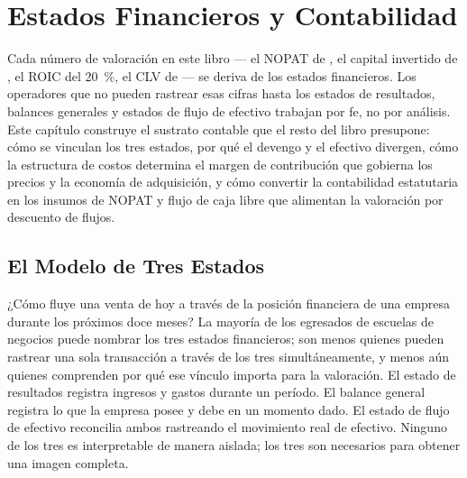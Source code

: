 \chapter{Estados Financieros y Contabilidad}\label{ch:financial-statements}


Cada número de valoración en este libro --- el NOPAT de , el capital invertido de
, el ROIC del \qty{20}{\percent}, el CLV de  --- se deriva de los
estados financieros. Los operadores que no pueden rastrear esas cifras hasta los estados de
resultados, balances generales y estados de flujo de efectivo trabajan por fe, no por análisis.
Este capítulo construye el sustrato contable que el resto del libro presupone: cómo se vinculan
los tres estados, por qué el devengo y el efectivo divergen, cómo la estructura de costos determina
el margen de contribución que gobierna los precios y la economía de adquisición, y cómo convertir
la contabilidad estatutaria en los insumos de NOPAT y flujo de caja libre que alimentan la
valoración por descuento de flujos.

\section{El Modelo de Tres Estados}\label{sec:three-statements}

¿Cómo fluye una venta de hoy a través de la posición financiera de una empresa durante los
próximos doce meses? La mayoría de los egresados de escuelas de negocios puede nombrar los tres
estados financieros; son menos quienes pueden rastrear una sola transacción a través de los tres
simultáneamente, y menos aún quienes comprenden por qué ese vínculo importa para la valoración.
El estado de resultados registra ingresos y gastos durante un período. El balance general registra
lo que la empresa posee y debe en un momento dado. El estado de flujo de efectivo reconcilia ambos
rastreando el movimiento real de efectivo. Ninguno de los tres es interpretable de manera aislada;
los tres son necesarios para obtener una imagen completa.

